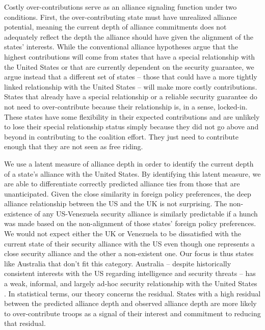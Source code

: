 \documentclass[12pt,letterpaper]{article}
\begin{document}
		Costly over-contributions serve as an alliance signaling function under two conditions. First, the over-contributing state must have unrealized alliance potential, meaning the current depth of alliance commitments does not adequately reflect the depth the alliance should have given the alignment of the states' interests. While the conventional alliance hypotheses argue that the highest contributions will come from states that have a special relationship with the United States or that are currently dependent on the security guarantee, we argue instead that a different set of states -- those that could have a more tightly linked relationship with the United States -- will make more costly contributions. States that already have a special relationship or a reliable security guarantee do not need to over-contribute because their relationship is, in a sense, locked-in. These states have some flexibility in their expected contributions and are unlikely to lose their special relationship status simply because they did not go above and beyond in contributing to the coalition effort. They just need to contribute enough that they are not seen as free riding. 

		We use a latent measure of alliance depth in order to identify the current depth of a state's alliance with the United States. By identifying this latent measure, we are able
		to differentiate correctly predicted alliance ties from those that are unanticipated. Given the close similarity in foreign policy preferences, the deep alliance relationship between the US and the UK is not surprising. The non-existence of any US-Venezuela security alliance is similarly predictable if a hunch was made based on the non-alignment of those states' foreign policy preferences. We would not expect either the UK or Venezuela to be dissatisfied with the current state of their security alliance with the US even though one represents a close security alliance and the other a non-existent one. Our focus is thus states like Australia that don't fit this category. Australia -- despite historically consistent interests with the US regarding intelligence and security threats -- has a weak, informal, and largely ad-hoc security relationship with the United States \citep{fruhling_anzusreallyalliance_2018}. In statistical terms, our theory concerns the residual. States with a high residual between the predicted alliance depth and observed alliance depth are more likely to over-contribute troops as a signal of their interest and commitment to reducing that residual.
		
\end{document}
